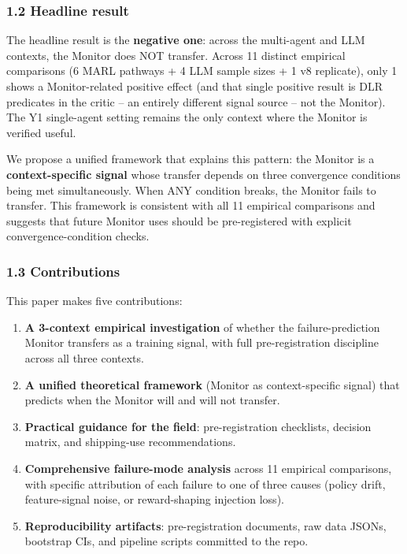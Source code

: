 \documentclass[11pt]{article}
\begin{document}
\subsubsection{1.2 Headline result}\label{headline-result}

The headline result is the \textbf{negative one}: across the multi-agent
and LLM contexts, the Monitor does NOT transfer. Across 11 distinct
empirical comparisons (6 MARL pathways + 4 LLM sample sizes + 1 v8
replicate), only 1 shows a Monitor-related positive effect (and that
single positive result is DLR predicates in the critic -- an entirely
different signal source -- not the Monitor). The Y1 single-agent setting
remains the only context where the Monitor is verified useful.

We propose a unified framework that explains this pattern: the Monitor
is a \textbf{context-specific signal} whose transfer depends on three
convergence conditions being met simultaneously. When ANY condition
breaks, the Monitor fails to transfer. This framework is consistent with
all 11 empirical comparisons and suggests that future Monitor uses
should be pre-registered with explicit convergence-condition checks.

\subsubsection{1.3 Contributions}\label{contributions}

This paper makes five contributions:

\begin{enumerate}
\def\labelenumi{\arabic{enumi}.}

\item
  \textbf{A 3-context empirical investigation} of whether the
  failure-prediction Monitor transfers as a training signal, with full
  pre-registration discipline across all three contexts.
\item
  \textbf{A unified theoretical framework} (Monitor as context-specific
  signal) that predicts when the Monitor will and will not transfer.
\item
  \textbf{Practical guidance for the field}: pre-registration
  checklists, decision matrix, and shipping-use recommendations.
\item
  \textbf{Comprehensive failure-mode analysis} across 11 empirical
  comparisons, with specific attribution of each failure to one of three
  causes (policy drift, feature-signal noise, or reward-shaping
  injection loss).
\item
  \textbf{Reproducibility artifacts}: pre-registration documents, raw
  data JSONs, bootstrap CIs, and pipeline scripts committed to the repo.
\end{enumerate}
\end{document}
